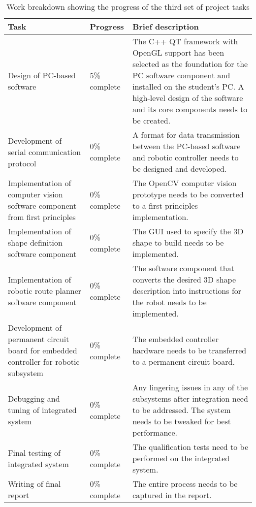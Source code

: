 \begin{table}[ht]
	\centering
	\begin{tabular}{|>{\raggedright}p{4.5cm}|>{\raggedright}p{2.8cm}|>{\raggedright\arraybackslash}p{6.8cm}|}
		\hline
		\textbf{Task} & \textbf{Progress} & \textbf{Brief description} \\ \hline
		Design of PC-based software & 5\% complete & The C++ QT framework with OpenGL support has been selected as the foundation for the PC software component and installed on the student's PC. A high-level design of the software and its core components needs to be created. \\ \hline
		Development of serial communication protocol & 0\% complete & A format for data transmission between the PC-based software and robotic controller needs to be designed and developed. \\ \hline
		Implementation of computer vision software component from first principles & 0\% complete & The OpenCV computer vision prototype needs to be converted to a first principles implementation. \\ \hline
		Implementation of shape definition software component & 0\% complete & The GUI used to specify the 3D shape to build needs to be implemented. \\ \hline
		Implementation of robotic route planner software component & 0\% complete & The software component that converts the desired 3D shape description into instructions for the robot needs to be implemented. \\ \hline
		Development of permanent circuit board for embedded controller for robotic subsystem & 0\% complete & The embedded controller hardware needs to be transferred to a permanent circuit board. \\ \hline
		Debugging and tuning of integrated system & 0\% complete & Any lingering issues in any of the subsystems after integration need to be addressed. The system needs to be tweaked for best performance. \\ \hline
		Final testing of integrated system & 0\% complete & The qualification tests need to be performed on the integrated system. \\ \hline
		Writing of final report & 0\% complete & The entire process needs to be captured in the report. \\ \hline
	\end{tabular}
	\caption{Work breakdown showing the progress of the third set of project tasks}
\end{table}

